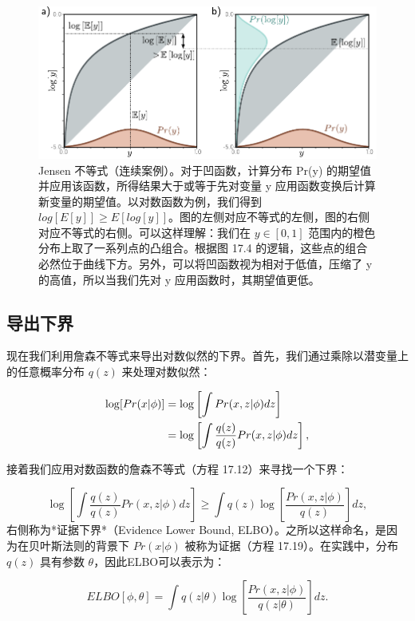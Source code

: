 \documentclass[lang=cn,newtx,10pt,scheme=chinese]{elegantbook}
\begin{document}
\begin{figure}[ht!]
\centering
\includegraphics[width=0.7\linewidth]{PDFFigures/UDLChap17PDF/VAEJensen.pdf}
\caption{Jensen 不等式（连续案例）。对于凹函数，计算分布 Pr(y) 的期望值并应用该函数，所得结果大于或等于先对变量 y 应用函数变换后计算新变量的期望值。以对数函数为例，我们得到 \(log[E[y]] \geq E[log[y]]\)。图的左侧对应不等式的左侧，图的右侧对应不等式的右侧。可以这样理解：我们在 \(y \in [0, 1]\) 范围内的橙色分布上取了一系列点的凸组合。根据图 17.4 的逻辑，这些点的组合必然位于曲线下方。另外，可以将凹函数视为相对于低值，压缩了 y 的高值，所以当我们先对 y 应用函数时，其期望值更低。}
\end{figure}


\subsection{导出下界}

现在我们利用詹森不等式来导出对数似然的下界。首先，我们通过乘除以潜变量上的任意概率分布 \(q(z)\) 来处理对数似然：


\begin{align}
\log[Pr(x|\phi)] &= \log \left[ \int Pr(x, z|\phi) dz \right] \notag \\
&= \log \left[ \int \frac{q(z)}{q(z)} Pr(x, z|\phi) dz \right], 
\end{align} 


接着我们应用对数函数的詹森不等式（方程 17.12）来寻找一个下界：

\begin{equation}
\log \left[ \int \frac{q(z)}{q(z)} Pr(x, z|\phi) dz \right] \geq \int q(z) \log \left[ \frac{Pr(x, z|\phi)}{q(z)} \right] dz, 
\end{equation}
右侧称为*证据下界*（Evidence Lower Bound, ELBO）。之所以这样命名，是因为在贝叶斯法则的背景下 \(Pr(x|\phi)\) 被称为证据（方程 17.19）。在实践中，分布 \(q(z)\) 具有参数 \(\theta\)，因此ELBO可以表示为：

\begin{equation}
ELBO[\phi, \theta] = \int q(z|\theta) \log \left[ \frac{Pr(x, z|\phi)}{q(z|\theta)} \right] dz. 
\end{equation}
\end{document}
